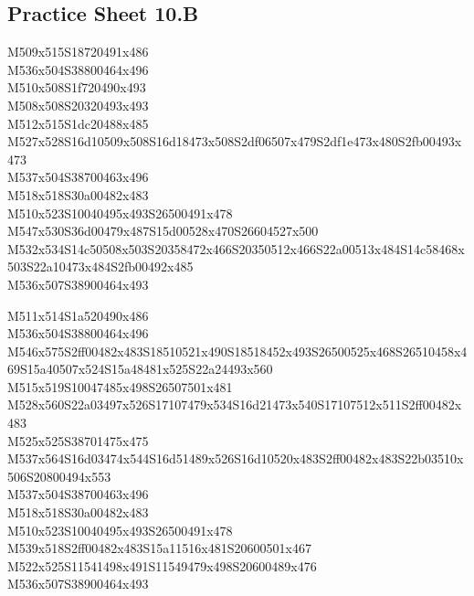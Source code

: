 \documentclass{article}
\begin{document}
\subsection{Practice Sheet 10.B}

\begin{multicols}{5}
\begin{center}

M509x515S18720491x486 %
\\M536x504S38800464x496 %
\\M510x508S1f720490x493 %
\\M508x508S20320493x493 %
\\M512x515S1dc20488x485 %
\\M527x528S16d10509x508S16d18473x508S2df06507x479S2df1e473x480S2fb00493x473 %
\\M537x504S38700463x496 %
\\M518x518S30a00482x483 %
\\M510x523S10040495x493S26500491x478 %
\\M547x530S36d00479x487S15d00528x470S26604527x500 %
\\M532x534S14c50508x503S20358472x466S20350512x466S22a00513x484S14c58468x503S22a10473x484S2fb00492x485 %
\\M536x507S38900464x493 %
\vfil
\columnbreak

M511x514S1a520490x486 %
\\M536x504S38800464x496 %
\\M546x575S2ff00482x483S18510521x490S18518452x493S26500525x468S26510458x469S15a40507x524S15a48481x525S22a24493x560 %
\\M515x519S10047485x498S26507501x481 %
\\M528x560S22a03497x526S17107479x534S16d21473x540S17107512x511S2ff00482x483 %
\\M525x525S38701475x475 %
\\M537x564S16d03474x544S16d51489x526S16d10520x483S2ff00482x483S22b03510x506S20800494x553 %
\\M537x504S38700463x496 %
\\M518x518S30a00482x483 %
\\M510x523S10040495x493S26500491x478 %
\\M539x518S2ff00482x483S15a11516x481S20600501x467 %
\\M522x525S11541498x491S11549479x498S20600489x476 %
\\M536x507S38900464x493 %
\vfil
\columnbreak


\end{center}
\end{multicols}
\end{document}
